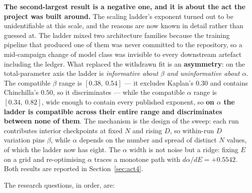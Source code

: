 \documentclass[11pt,a4paper]{article}
\begin{document}
\textbf{The second-largest result is a negative one, and it is about the act
the project was built around.} The scaling ladder's exponent turned out to be
unidentifiable at this scale, and the reasons are now known in detail rather
than guessed at. The ladder mixed two architecture families because the
training pipeline that produced one of them was never committed to the
repository, so a mid-campaign change of model class was invisible to every
downstream artefact including the ledger. What replaced the withdrawn fit is
an \textbf{asymmetry}: on the total-parameter axis the ladder is
\emph{informative about $\beta$ and uninformative about $\alpha$}. The
compatible $\beta$ range is $[0.38,\ 0.54]$ --- it excludes Kaplan's $0.30$
and contains Chinchilla's $0.50$, so it discriminates --- while the compatible
$\alpha$ range is $[0.34,\ 0.82]$, wide enough to contain every published
exponent, so \textbf{on $\alpha$ the ladder is compatible across their entire
range and discriminates between none of them}. The mechanism is the design of
the sweep: each run contributes interior checkpoints at fixed $N$ and rising
$D$, so within-run $D$ variation pins $\beta$, while $\alpha$ depends on the
number and spread of distinct $N$ values, of which the ladder now has eight. The
$\alpha$ width is not noise but a ridge: fixing $E$ on a grid and re-optimising
$\alpha$ traces a monotone path with $d\alpha/dE = +0.5542$. Both results are
reported in Section~\ref{sec:act4}. %

The research questions, in order, are:
\end{document}
